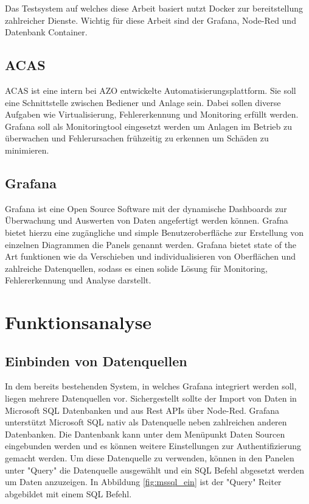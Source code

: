 \documentclass[a4paper, 12pt, oneside]{scrbook}
\begin{document}
			\noindent Das Testsystem auf welches diese Arbeit basiert nutzt Docker zur bereitstellung zahlreicher Dienste. Wichtig für diese Arbeit sind der Grafana, Node-Red und Datenbank Container.
		\section{ACAS}
			\noindent ACAS ist eine intern bei AZO entwickelte Automatisierungsplattform. Sie soll eine Schnittstelle zwischen Bediener und Anlage sein. Dabei sollen diverse Aufgaben wie Virtualisierung, Fehlererkennung und Monitoring erfüllt werden. Grafana soll als Monitoringtool eingesetzt werden um Anlagen im Betrieb zu überwachen und Fehlerursachen frühzeitig zu erkennen um Schäden zu minimieren.
		\section{Grafana}
			\noindent Grafana ist eine Open Source Software mit der dynamische Dashboards zur Überwachung und Auswerten von Daten angefertigt werden können. Grafna bietet hierzu eine zugängliche und simple Benutzeroberfläche zur Erstellung von einzelnen Diagrammen die Panels genannt werden. Grafana bietet state of the Art funktionen wie da Verschieben und individualisieren von Oberflächen und zahlreiche Datenquellen, sodass es einen solide Lösung für Monitoring, Fehlererkennung und Analyse darstellt.
	
	\chapter{Funktionsanalyse}
	 
	 \section{Einbinden von Datenquellen}
	 
	 	\noindent In dem bereits bestehenden System, in welches Grafana integriert werden soll, liegen mehrere Datenquellen vor. Sichergestellt sollte der Import von Daten in Microsoft SQL Datenbanken und aus Rest APIs über Node-Red. Grafana unterstützt Microsoft SQL nativ als Datenquelle neben zahlreichen anderen Datenbanken. Die Dantenbank kann unter dem Menüpunkt Daten Sourcen eingebunden werden und es können weitere Einstellungen zur Authentifizierung gemacht werden. Um diese Datenquelle zu verwenden, können in den Panelen unter "Query" die Datenquelle ausgewählt und ein SQL Befehl abgesetzt werden um Daten anzuzeigen. In Abbildung \ref{fig:mssql_ein} ist der "Query" Reiter abgebildet mit einem SQL Befehl. 
	 	
\end{document}
